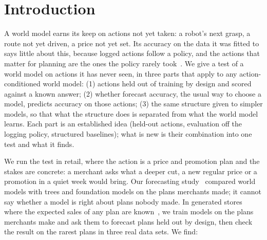 
\section{Introduction}\label{sec:intro}

A world model earns its keep on actions not yet taken: a robot's next grasp, a route not yet driven, a price not yet
set. Its accuracy on the data it was fitted to says little about this, because logged actions follow a policy, and
the actions that matter for planning are the ones the policy rarely took~\cite{levine2020}. We give a test of a world
model on actions it has never seen, in three parts that apply to any action-conditioned world model: (1) actions held
out of training by design and scored against a known answer; (2) whether forecast accuracy, the usual way to choose
a model, predicts accuracy on those actions; (3) the same structure given to simpler models, so that what the
structure does is separated from what the world model learns. Each part is an established idea (held-out actions, evaluation off the
logging policy, structured baselines); what is new is their combination into one test and what it finds.

We run the test in retail, where the action is a price and promotion plan and the stakes are concrete: a merchant
asks what a deeper cut, a new regular price or a promotion in a quiet week would bring. Our forecasting
study~\cite{rwm} compared world models with trees and foundation models on the plans merchants made; it cannot say
whether a model is right about plans nobody made. In generated stores where the expected sales of any plan are
known~\cite{paper2}, we train models on the plans merchants make and ask them to forecast plans held out by design,
then check the result on the rarest plans in three real data sets. We find:


